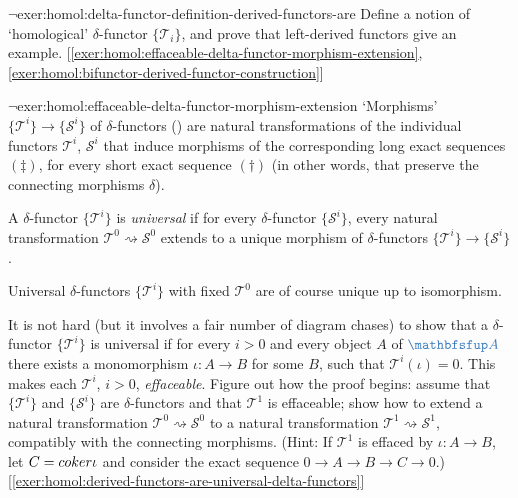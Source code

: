 \begin{exer}{$\lnot$}{exer:homol:delta-functor-definition-derived-functors-are}
  Define a notion of `homological' $\delta$-functor
  $\{\mathscr{T}_i\}$, and prove that left-derived functors give an
  example. [\ref{exer:homol:effaceable-delta-functor-morphism-extension},
  \ref{exer:homol:bifunctor-derived-functor-construction}]
\end{exer}
\begin{exer}{$\lnot$}{exer:homol:effaceable-delta-functor-morphism-extension}
  `Morphisms' $\{\mathscr{T}^i\} \to \{\mathscr{S}^i\}$ of
  $\delta$-functors
  ()
  are natural transformations of the individual functors
  $\mathscr{T}^i$, $\mathscr{S}^i$ that induce morphisms of the
  corresponding long exact sequences $(\ddagger)$, for every short
  exact sequence $(\dagger)$ (in other words, that preserve the
  connecting morphisms $\delta$).

  A $\delta$-functor $\{\mathscr{T}^i\}$ is \emph{universal} if for
  every $\delta$-functor $\{\mathscr{S}^i\}$, every natural
  transformation $\mathscr{T}^0 \rightsquigarrow \mathscr{S}^0$
  extends to a unique morphism of $\delta$-functors
  $\{\mathscr{T}^i\} \to \{\mathscr{S}^i\}$.

  Universal $\delta$-functors $\{\mathscr{T}^i\}$ with fixed
  $\mathscr{T}^0$ are of course unique up to isomorphism.

  It is not hard (but it involves a fair number of diagram chases) to
  show that a $\delta$-functor $\{\mathscr{T}^i\}$ is universal if for
  every $i > 0$ and every object $A$ of $\categ{A}$ there exists a
  monomorphism $\iota : A \to B$ for some $B$, such that
  $\mathscr{T}^i(\iota) = 0$. This makes each $\mathscr{T}^i$,
  $i > 0$, \emph{effaceable}. Figure out how the proof begins: assume
  that $\{\mathscr{T}^i\}$ and $\{\mathscr{S}^i\}$ are
  $\delta$-functors and that $\mathscr{T}^1$ is effaceable; show how
  to extend a natural transformation
  $\mathscr{T}^0 \rightsquigarrow \mathscr{S}^0$ to a natural
  transformation $\mathscr{T}^1 \rightsquigarrow \mathscr{S}^1$,
  compatibly with the connecting morphisms. (Hint: If $\mathscr{T}^1$
  is effaced by $\iota : A \to B$, let $C = coker\iota$ and consider
  the exact sequence $0 \to A \to B \to C \to 0$.)
  [\ref{exer:homol:derived-functors-are-universal-delta-functors}]
\end{exer}
